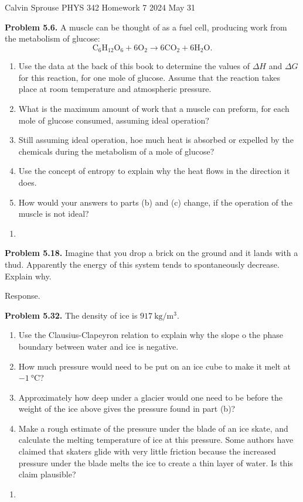 \documentclass[a4paper, 12pt]{config/homework}
\begin{document}
\noindent
Calvin Sprouse \hfill PHYS 342 Homework 7 \hfill 2024 May 31
\bigskip

\bigskip\noindent
\textbf{Problem 5.6.} A muscle can be thought of as a fuel cell, producing work from the metabolism of glucose:
\[\text{C}_6\text{H}_{12}\text{O}_6 + 6\text{O}_2 \longrightarrow 6\text{CO}_2 + 6\text{H}_2\text{O}.\]
\begin{enumerate}[label=\textbf{(\alph*)}]
\item Use the data at the back of this book to determine the values of \(\Delta H\) and \(\Delta G\) for this reaction, for one mole of glucose. Assume that the reaction takes place at room temperature and atmospheric pressure.
\item What is the maximum amount of work that a muscle can preform, for each mole of glucose consumed, assuming ideal operation?
\item Still assuming ideal operation, hoe much heat is absorbed or expelled by the chemicals during the metabolism of a mole of glucose?
\item Use the concept of entropy to explain why the heat flows in the direction it does.
\item How would your answers to parts (b) and (c) change, if the operation of the muscle is not ideal?
\end{enumerate}
\begin{enumerate}[label=\textbf{(\alph*)}]
\item 
\end{enumerate}

\pagebreak\noindent
\textbf{Problem 5.18.} Imagine that you drop a brick on the ground and it lands with a thud. Apparently the energy of this system tends to spontaneously decrease. Explain why.

\bigskip\noindent
Response.

\pagebreak\noindent
\textbf{Problem 5.32.} The density of ice is \(\qty{917}{\kg\per\meter\cubed}\).
\begin{enumerate}[label=\textbf{(\alph*)}]
\item Use the Clausius-Clapeyron relation to explain why the slope o the phase boundary between water and ice is negative.
\item How much pressure would need to be put on an ice cube to make it melt at \(\qty{-1}{\celsius}\)?
\item Approximately how deep under a glacier would one need to be before the weight of the ice above gives the pressure found in part (b)?
\item Make a rough estimate of the pressure under the blade of an ice skate, and calculate the melting temperature of ice at this pressure. Some authors have claimed that skaters glide with very little friction because the increased pressure under the blade melts the ice to create a thin layer of water. Is this claim plausible?
\end{enumerate}
\begin{enumerate}[label=\textbf{(\alph*)}]
\item 
\end{enumerate}
\end{document}
